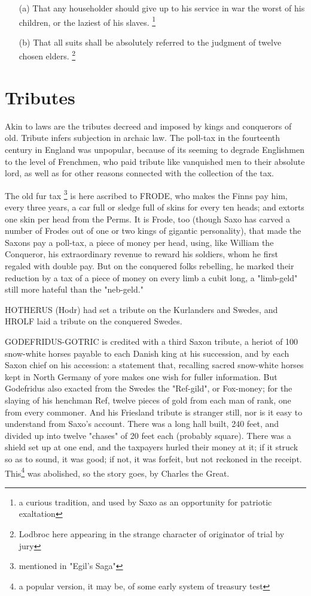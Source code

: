 \documentclass[10pt,a4paper]{report}
\begin{document}
\begin{itemize}
\item[(a)] That any householder should give up to his service in war the worst of his children, or the laziest of his slaves. \footnote{a curious tradition, and used by Saxo as an opportunity for patriotic exaltation}
\item[(b)] That all suits shall be absolutely referred to the judgment of twelve chosen elders. \footnote{Lodbroc here appearing in the strange character of originator of trial by jury}
\end{itemize}

\section{Tributes}
Akin to laws are the tributes decreed and imposed by kings and conquerors of old. Tribute infers subjection in archaic law. The poll-tax in the fourteenth century in England was unpopular, because of its seeming to degrade Englishmen to the level of Frenchmen, who paid tribute like vanquished men to their absolute lord, as well as for other reasons connected with the collection of the tax.

The old fur tax \footnote{mentioned in "Egil's Saga"} is here ascribed to FRODE, who makes the Finns pay him, every three years, a car full or sledge full of skins for every ten heads; and extorts one skin per head from the Perms. It is Frode, too (though Saxo has carved a number of Frodes out of one or two kings of gigantic personality), that made the Saxons pay a poll-tax, a piece of money per head, using, like William the Conqueror, his extraordinary revenue to reward his soldiers, whom he first regaled with double pay. But on the conquered folks rebelling, he marked their reduction by a tax of a piece of money on every limb a cubit long, a "limb-geld" still more hateful than the "neb-geld."

HOTHERUS (Hodr) had set a tribute on the Kurlanders and Swedes, and HROLF laid a tribute on the conquered Swedes.

GODEFRIDUS-GOTRIC is credited with a third Saxon tribute, a heriot of 100 snow-white horses payable to each Danish king at his succession, and by each Saxon chief on his accession: a statement that, recalling sacred snow-white horses kept in North Germany of yore makes one wish for fuller information. But Godefridus also exacted from the Swedes the "Ref-gild", or Fox-money; for the slaying of his henchman Ref, twelve pieces of gold from each man of rank, one from every commoner. And his Friesland tribute is stranger still, nor is it easy to understand from Saxo's account. There was a long hall built, 240 feet, and divided up into twelve "chases" of 20 feet each (probably square). There was a shield set up at one end, and the taxpayers hurled their money at it; if it struck so as to sound, it was good; if not, it was forfeit, but not reckoned in the receipt. This\footnote{a popular version, it may be, of some early system of treasury test} was abolished, so the story goes, by Charles the Great.
\end{document}
